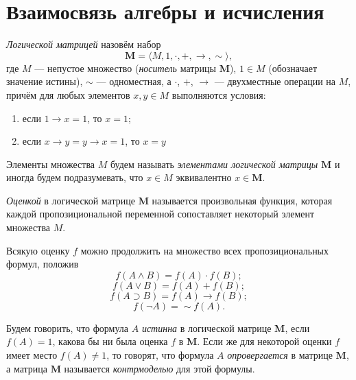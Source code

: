 \section{Взаимосвязь алгебры и исчисления}

\begin{definition}
    \textit{Логической матрицей} назовём набор 
    \begin{equation*}
        \mathbf{M}=\langle M, 1, \cdot, +, \to, \sim \rangle,
    \end{equation*}
    где $M$ --- непустое множество (\textit{носитель} матрицы $\mathbf{M}$), $1\in M$ (обозначает значение истины), $\sim$ --- одноместная, а $\cdot$, $+$, $\to$ --- двухместные операции на $M$, причём для любых элементов $x,y\in M$ выполняются условия:
    \begin{enumerate}
        \item если $1\to x =1$, то $x=1$;
        \item если $x\to y=y \to x = 1$, то $x=y$ 
    \end{enumerate}
\end{definition}

\begin{remark}
    Элементы множества $M$ будем называть \textit{элементами логической матрицы} $\mathbf{M}$ и иногда будем подразумевать, что $x\in M$ эквивалентно $x\in \mathbf{M}$.
\end{remark}

\begin{definition}
    \textit{Оценкой} в логической матрице $\mathbf{M}$ называется произвольная функция, которая каждой пропозициональной переменной сопоставляет некоторый элемент множества $M$.
\end{definition}

Всякую оценку $f$ можно продолжить на множество всех пропозициональных формул, положив
\begin{equation*}
    f(A\land B)=f(A)\cdot f(B);
\end{equation*}
\begin{equation*}
    f(A \lor B)= f(A)+f(B);
\end{equation*}
\begin{equation*}
    f(A\supset B)=f(A) \to f(B);
\end{equation*}
\begin{equation*}
    f(\lnot A)=\sim f(A).
\end{equation*}

Будем говорить, что формула $A$ \textit{истинна} в логической матрице $\mathbf{M}$, если $f(A)=1$, какова бы ни была оценка $f$ в $\mathbf{M}$. Если же для некоторой оценки $f$ имеет место $f(A)\ne 1$, то говорят, что формула $A$ \textit{опровергается} в матрице $\mathbf{M}$, а матрица $\mathbf{M}$ называется \textit{контрмоделью} для этой формулы.

